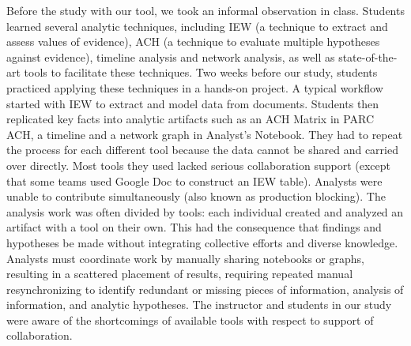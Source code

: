 Before the study with our tool, we took an informal observation in
class. Students learned several analytic techniques, including IEW (a
technique to extract and assess values of evidence), ACH (a technique to
evaluate multiple hypotheses against evidence), timeline analysis and
network analysis, as well as state-of-the-art tools to facilitate these
techniques. Two weeks before our study, students practiced applying
these techniques in a hands-on project. A typical workflow started with
IEW to extract and model data from documents. Students then replicated
key facts into analytic artifacts such as an ACH Matrix in PARC ACH, a
timeline and a network graph in Analyst's Notebook. They had to repeat
the process for each different tool because the data cannot be shared
and carried over directly. Most tools they used lacked serious
collaboration support (except that some teams used Google Doc to
construct an IEW table). Analysts were unable to contribute
simultaneously (also known as production blocking). The analysis work
was often divided by tools: each individual created and analyzed an
artifact with a tool on their own. This had the consequence that
findings and hypotheses be made without integrating collective efforts
and diverse knowledge. Analysts must coordinate work by manually sharing
notebooks or graphs, resulting in a scattered placement of results,
requiring repeated manual resynchronizing to identify redundant or
missing pieces of information, analysis of information, and analytic
hypotheses. The instructor and students in our study were aware of the
shortcomings of available tools with respect to support of
collaboration.